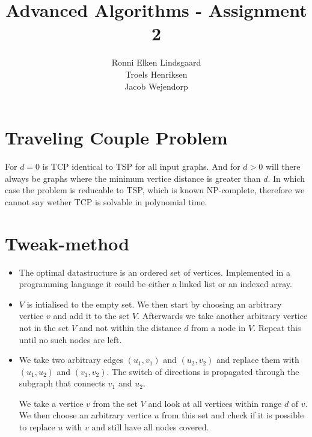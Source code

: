 \documentclass{article}
\title{Advanced Algorithms - Assignment 2}
\author{Ronni Elken Lindsgaard\\
Troels Henriksen\\
Jacob Wejendorp}
\begin{document}
\maketitle
\section{Traveling Couple Problem}
For $d=0$ is TCP identical to TSP for all input graphs. And for $d > 0$
will there always be graphs where the minimum vertice distance is
greater than $d$. In which case the problem is reducable to TSP, which
is known NP-complete, therefore we cannot say wether TCP is solvable in
polynomial time.
\section{Tweak-method}
\begin{itemize}
\item The optimal datastructure is an ordered set of vertices.
Implemented in a programming language it could be either a linked list
or an indexed array.
\item $V$ is intialised to the empty set. We then start by choosing an arbitrary vertice $v$ and add it to the set $V$. 
Afterwards we take another arbitrary vertice not in the set $V$ and not
within the distance $d$ from a node in $V$. Repeat this until no such nodes are left.
\item We take two arbitrary edges $(u_1,v_1)$ and $(u_2,v_2)$ and
replace them with $(u_1,u_2)$ and $(v_1,v_2)$. The switch of directions
is propagated through the subgraph that connects $v_1$ and $u_2$.

We take a vertice $v$ from the set $V$ and look at all vertices within
range $d$ of $v$. We then choose an arbitrary vertice $u$ from this set
and check if it is possible to replace $u$ with $v$ and still have all
nodes covered.

\end{itemize}
\end{document}
